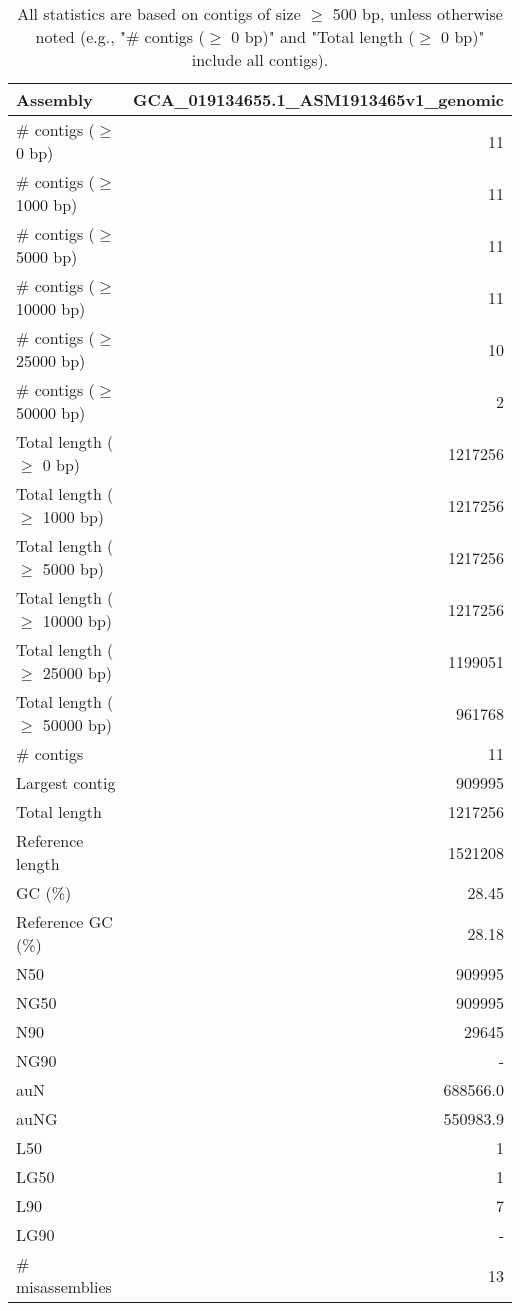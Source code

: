 \documentclass[12pt,a4paper]{article}
\begin{document}
\begin{table}[ht]
\begin{center}
\caption{All statistics are based on contigs of size $\geq$ 500 bp, unless otherwise noted (e.g., "\# contigs ($\geq$ 0 bp)" and "Total length ($\geq$ 0 bp)" include all contigs).}
\begin{tabular}{|l*{1}{|r}|}
\hline
Assembly & GCA\_019134655.1\_ASM1913465v1\_genomic \\ \hline
\# contigs ($\geq$ 0 bp) & 11 \\ \hline
\# contigs ($\geq$ 1000 bp) & 11 \\ \hline
\# contigs ($\geq$ 5000 bp) & 11 \\ \hline
\# contigs ($\geq$ 10000 bp) & 11 \\ \hline
\# contigs ($\geq$ 25000 bp) & 10 \\ \hline
\# contigs ($\geq$ 50000 bp) & 2 \\ \hline
Total length ($\geq$ 0 bp) & 1217256 \\ \hline
Total length ($\geq$ 1000 bp) & 1217256 \\ \hline
Total length ($\geq$ 5000 bp) & 1217256 \\ \hline
Total length ($\geq$ 10000 bp) & 1217256 \\ \hline
Total length ($\geq$ 25000 bp) & 1199051 \\ \hline
Total length ($\geq$ 50000 bp) & 961768 \\ \hline
\# contigs & 11 \\ \hline
Largest contig & 909995 \\ \hline
Total length & 1217256 \\ \hline
Reference length & 1521208 \\ \hline
GC (\%) & 28.45 \\ \hline
Reference GC (\%) & 28.18 \\ \hline
N50 & 909995 \\ \hline
NG50 & 909995 \\ \hline
N90 & 29645 \\ \hline
NG90 & - \\ \hline
auN & 688566.0 \\ \hline
auNG & 550983.9 \\ \hline
L50 & 1 \\ \hline
LG50 & 1 \\ \hline
L90 & 7 \\ \hline
LG90 & - \\ \hline
\# misassemblies & 13 \\ \hline

\end{tabular}
\end{center}
\end{table}
\end{document}
